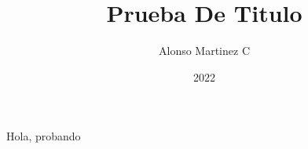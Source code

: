 \documentclass{sty/itam-thesis}
\author{Alonso Martinez C}
\title{Prueba De Titulo}
\date{2022}
\begin{document}
\maketitle
\makefrontmatter

\mainmatter
Hola, probando \gitAbbrevHash{}
\end{document}

